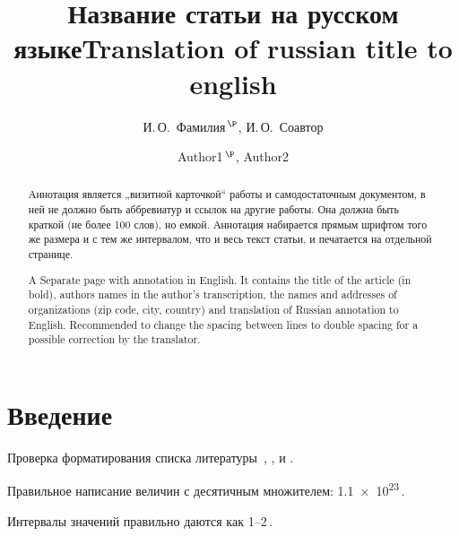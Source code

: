 \documentclass[14pt]{extarticle}
\begin{document}
\title{Название статьи на русском языке}
\author{И.\,О.~Фамилия$^{\,\P}$, И.\,О.~Соавтор}
\address{Физико-технический институт им. А. Ф. Иоффе Российской академии наук, 
\\ 194021, Санкт-Петербург, Россия.}
\maketitle

\begin{abstract}
	Аннотация является „визитной карточкой“ работы и самодостаточным документом,
	в ней не должно быть аббревиатур и ссылок на другие работы. Она должна быть краткой
	(не более 100 слов), но емкой. Аннотация набирается прямым шрифтом того же размера
	и с тем же интервалом, что и весь текст статьи, и печатается на отдельной странице.
\end{abstract}


\begin{otherlanguage}{english}
	\title{Translation of russian title to english}
	\author{Author1$^{\,\P}$, Author2}
	\address{Ioffe Physicotechnical Institute, Russian Academy of Sciences, \\
		194021, St. Petersburg, Russia.}
	\maketitle
	
	\begin{abstract}
		A Separate page with annotation in English. It contains the title of the article (in bold), authors names in the author's transcription, the names and addresses of organizations (zip code, city, country) and translation of Russian annotation to English.  Recommended to change the spacing between lines to double spacing for a possible correction by the translator.
	\end{abstract}
\end{otherlanguage}

\section{Введение}
Проверка форматирования списка литературы~\cite{ref1,ref2,ref3},
\cite{ref4},
\cite{ref5,ref5eng,ref6} и 
\cite{ref7,ref8,ref9}.

Правильное написание величин с десятичным множителем: 
\num{1,1e23}\,. \par
Интервалы значений правильно даются как \numrange{1}{2}\,\ph{\si{\angstrom}}. 
\par
\end{document}
